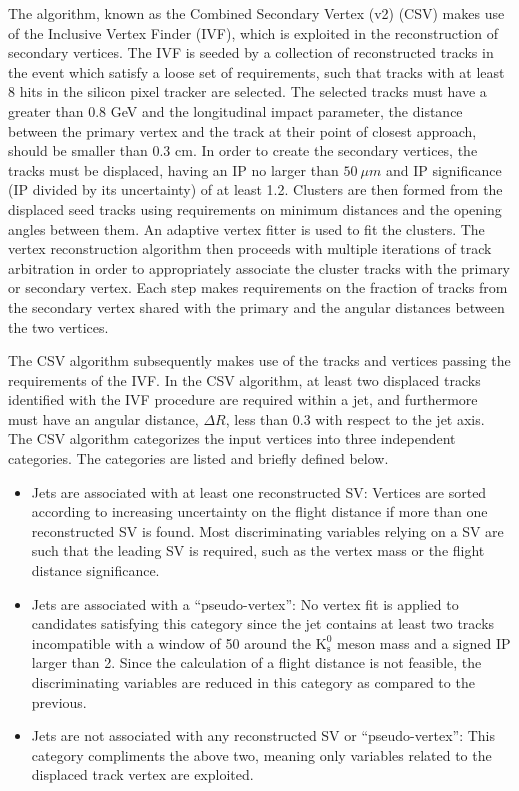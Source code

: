 The algorithm, known as the Combined Secondary Vertex (v2) (CSV) makes use of the Inclusive Vertex Finder (IVF), which is exploited in the reconstruction of secondary vertices. The IVF is seeded by a collection of reconstructed tracks in the event which satisfy a loose set of requirements, such that tracks with at least 8 hits in the silicon pixel tracker are selected. The selected tracks must have a \pt greater than 0.8 GeV and the longitudinal impact parameter, the distance between the primary vertex and the track at their point of closest approach, should be smaller than 0.3 cm. In order to create the secondary vertices, the tracks must be displaced, having an IP no larger than $50\:\mu m$ and IP significance (IP divided by its uncertainty) of at least 1.2. Clusters are then formed from the displaced seed tracks using requirements on minimum distances and the opening angles between them. An adaptive vertex fitter is used to fit the clusters. The vertex reconstruction algorithm then proceeds with multiple iterations of track arbitration in order to appropriately associate the cluster tracks with the primary or secondary vertex. Each step makes requirements on the fraction of tracks from the secondary vertex shared with the primary and the angular distances between the two vertices. 

The CSV algorithm subsequently makes use of the tracks and vertices passing the requirements of the IVF. In the CSV algorithm, at least two displaced tracks identified with the IVF procedure are required within a jet, and furthermore must have an angular distance, $\Delta R$, less than 0.3 with respect to the jet axis. The CSV algorithm categorizes the input vertices into three independent categories. The categories are listed and briefly defined below.

\begin{itemize}
\item Jets are associated with at least one reconstructed SV: Vertices are sorted according to increasing uncertainty on the flight distance if more than one reconstructed SV is found. Most discriminating variables relying on a SV are such that the leading SV is required, such as the vertex mass or the flight distance significance. 
\item Jets are associated with a ``pseudo-vertex'': No vertex fit is applied to candidates satisfying this category since the jet contains at least two tracks incompatible with a window of 50 \MeV around the $\mathrm{K_{s}^{0}}$ meson mass and a signed IP larger than 2. Since the calculation of a flight distance is not feasible, the discriminating variables are reduced in this category as compared to the previous.
\item Jets are not associated with any reconstructed SV or ``pseudo-vertex'': This category compliments the above two, meaning only variables related to the displaced track vertex are exploited.
\end{itemize}

